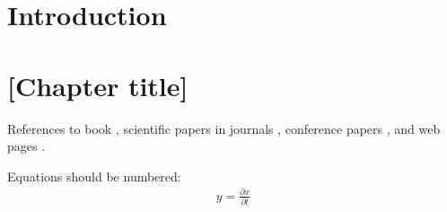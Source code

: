 \documentclass[a4paper,twoside,12pt]{book}
\newcounter{pagesWithoutNumbers}
\begin{document}
\setcounter{pagesWithoutNumbers}{\value{page}}
\mainmatter
\pagestyle{empty}

\cleardoublepage

\pagestyle{PageNumbersChapterTitles}


\chapter{Introduction}





\chapter{[Chapter title]}



References to 
book \cite{bib:book},
scientific papers in journals \cite{bib:article},
conference papers \cite{bib:conference},
and web pages \cite{bib:internet}.

Equations should be numbered:
\begin{align}
y = \frac{\partial x}{\partial t}
\end{align}
\end{document}
